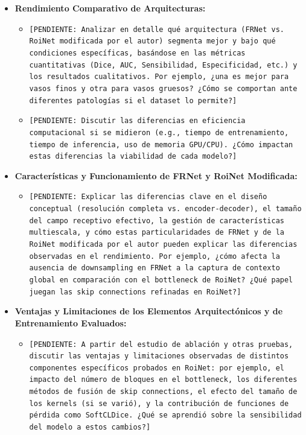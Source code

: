 \documentclass[11pt,a4paper]{report} %
\begin{document}
\begin{itemize}
    \item \textbf{Rendimiento Comparativo de Arquitecturas:}
        \begin{itemize}
            \item \texttt{[PENDIENTE: Analizar en detalle qué arquitectura (FRNet vs. RoiNet modificada por el autor) segmenta mejor y bajo qué condiciones específicas, basándose en las métricas cuantitativas (Dice, AUC, Sensibilidad, Especificidad, etc.) y los resultados cualitativos. Por ejemplo, ¿una es mejor para vasos finos y otra para vasos gruesos? ¿Cómo se comportan ante diferentes patologías si el dataset lo permite?]}
            \item \texttt{[PENDIENTE: Discutir las diferencias en eficiencia computacional si se midieron (e.g., tiempo de entrenamiento, tiempo de inferencia, uso de memoria GPU/CPU). ¿Cómo impactan estas diferencias la viabilidad de cada modelo?]}
        \end{itemize}
    \item \textbf{Características y Funcionamiento de FRNet y RoiNet Modificada:}
        \begin{itemize}
            \item \texttt{[PENDIENTE: Explicar las diferencias clave en el diseño conceptual (resolución completa vs. encoder-decoder), el tamaño del campo receptivo efectivo, la gestión de características multiescala, y cómo estas particularidades de FRNet y de la RoiNet modificada por el autor pueden explicar las diferencias observadas en el rendimiento. Por ejemplo, ¿cómo afecta la ausencia de downsampling en FRNet a la captura de contexto global en comparación con el bottleneck de RoiNet? ¿Qué papel juegan las skip connections refinadas en RoiNet?]}
        \end{itemize}
    \item \textbf{Ventajas y Limitaciones de los Elementos Arquitectónicos y de Entrenamiento Evaluados:}
        \begin{itemize}
            \item \texttt{[PENDIENTE: A partir del estudio de ablación y otras pruebas, discutir las ventajas y limitaciones observadas de distintos componentes específicos probados en RoiNet: por ejemplo, el impacto del número de bloques en el bottleneck, los diferentes métodos de fusión de skip connections, el efecto del tamaño de los kernels (si se varió), y la contribución de funciones de pérdida como SoftCLDice. ¿Qué se aprendió sobre la sensibilidad del modelo a estos cambios?]}

\end{itemize}
\end{itemize}
\end{document}
